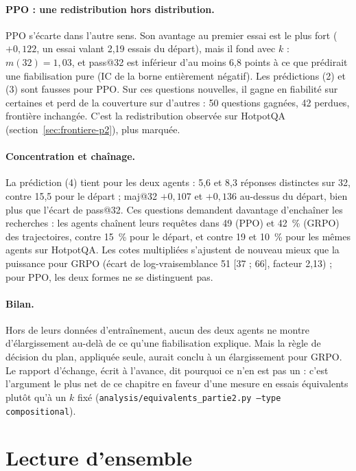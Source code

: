 \documentclass[11pt,a4paper]{article}
\begin{document}
\paragraph{PPO : une redistribution hors distribution.} PPO s'écarte dans l'autre sens. Son avantage au premier essai est le plus fort ($+0{,}122$, un essai valant 2,19 essais du départ), mais il fond avec $k$ : $m(32) = 1{,}03$, et pass@32 est inférieur d'au moins 6,8 points à ce que prédirait une fiabilisation pure (IC de la borne entièrement négatif). Les prédictions (2) et (3) sont fausses pour PPO. Sur ces questions nouvelles, il gagne en fiabilité sur certaines et perd de la couverture sur d'autres : 50 questions gagnées, 42 perdues, frontière inchangée. C'est la redistribution observée sur HotpotQA (section~\ref{sec:frontiere-p2}), plus marquée.

\paragraph{Concentration et chaînage.} La prédiction (4) tient pour les deux agents : 5,6 et 8,3 réponses distinctes sur 32, contre 15,5 pour le départ ; maj@32 $+0{,}107$ et $+0{,}136$ au-dessus du départ, bien plus que l'écart de pass@32. Ces questions demandent davantage d'enchaîner les recherches : les agents chaînent leurs requêtes dans 49 (PPO) et 42~\% (GRPO) des trajectoires, contre 15~\% pour le départ, et contre 19 et 10~\% pour les mêmes agents sur HotpotQA. Les cotes multipliées s'ajustent de nouveau mieux que la puissance pour GRPO (écart de log-vraisemblance 51 [37 ; 66], facteur 2,13) ; pour PPO, les deux formes ne se distinguent pas.

\paragraph{Bilan.} Hors de leurs données d'entraînement, aucun des deux agents ne montre d'élargissement au-delà de ce qu'une fiabilisation explique. Mais la règle de décision du plan, appliquée seule, aurait conclu à un élargissement pour GRPO. Le rapport d'échange, écrit à l'avance, dit pourquoi ce n'en est pas un : c'est l'argument le plus net de ce chapitre en faveur d'une mesure en essais équivalents plutôt qu'à un $k$ fixé (\texttt{analysis/equivalents\_partie2.py --type compositional}).

\section{Lecture d'ensemble}\label{sec:ensemble-p2}
\end{document}

